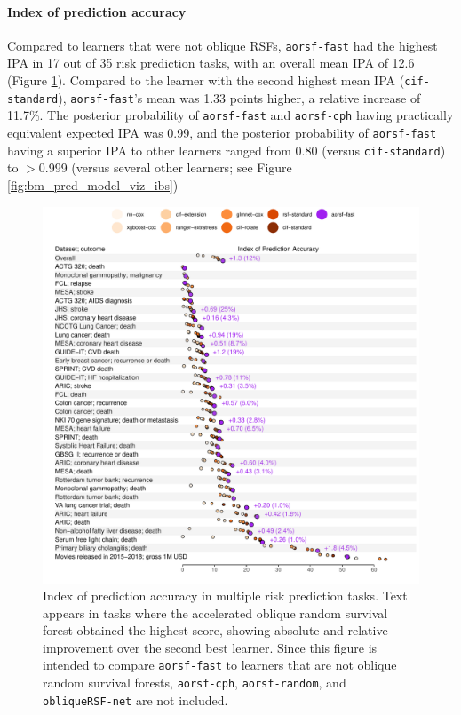 \documentclass[12pt]{article}\usepackage[]{graphicx}\usepackage[]{xcolor}
\makeatletter
\def\maxwidth{ %
  \ifdim\Gin@nat@width>\linewidth
    \linewidth
  \else
    \Gin@nat@width
  \fi
}
\newenvironment{knitrout}{}{} %
\makeatother
\begin{document}
\paragraph{Index of prediction accuracy}

Compared to learners that were not oblique RSFs, \texttt{aorsf-fast} had the highest IPA in 17 out of 35 risk prediction tasks, with an overall mean IPA of 12.6 (Figure \ref{fig:bm_pred_viz_ibs}). Compared to the learner with the second highest mean IPA (\texttt{cif-standard}), \texttt{aorsf-fast}'s mean was 1.33 points higher, a relative increase of 11.7\%. The posterior probability of \texttt{aorsf-fast} and \texttt{aorsf-cph} having practically equivalent expected IPA was 0.99, and the posterior probability of \texttt{aorsf-fast} having a superior IPA to other learners ranged from 0.80 (versus \texttt{cif-standard}) to $>$0.999 (versus several other learners; see Figure \ref{fig:bm_pred_model_viz_ibs})

\begin{knitrout}
\color{fgcolor}\begin{figure}
\includegraphics[width=\maxwidth]{figure/bm_pred_viz_ibs-1} \caption[Index of prediction accuracy in multiple risk prediction tasks]{Index of prediction accuracy in multiple risk prediction tasks. Text appears in tasks where the accelerated oblique random survival forest obtained the highest score, showing absolute and relative improvement over the second best learner. Since this figure is intended to compare \texttt{aorsf-fast} to learners that are not oblique random survival forests, \texttt{aorsf-cph}, \texttt{aorsf-random}, and \texttt{obliqueRSF-net} are not included.}\label{fig:bm_pred_viz_ibs}
\end{figure}

\end{knitrout}
\end{document}
